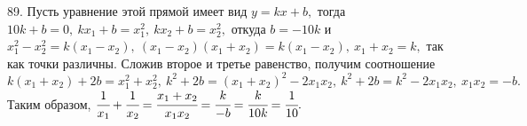 89. Пусть уравнение этой прямой имеет вид $y=kx+b,$ тогда $10k+b=0,\ kx_1+b=x_1^2,\ kx_2+b=x_2^2,$ откуда $b=-10k$ и $x_1^2-x_2^2=k(x_1-x_2),\
(x_1-x_2)(x_1+x_2)=k(x_1-x_2),\ x_1+x_2=k,$ так как точки различны.
 Сложив второе и третье равенство, получим соотношение $k(x_1+x_2)+2b=x_1^2+x_2^2,\ k^2+2b=(x_1+x_2)^2-2x_1x_2,\ k^2+2b=k^2-2x_1x_2,\ x_1x_2=-b.$ Таким образом, $\cfrac{1}{x_1}+\cfrac{1}{x_2}=\cfrac{x_1+x_2}{x_1x_2}=\cfrac{k}{-b}=\cfrac{k}{10k}=\cfrac{1}{10}.$\\
